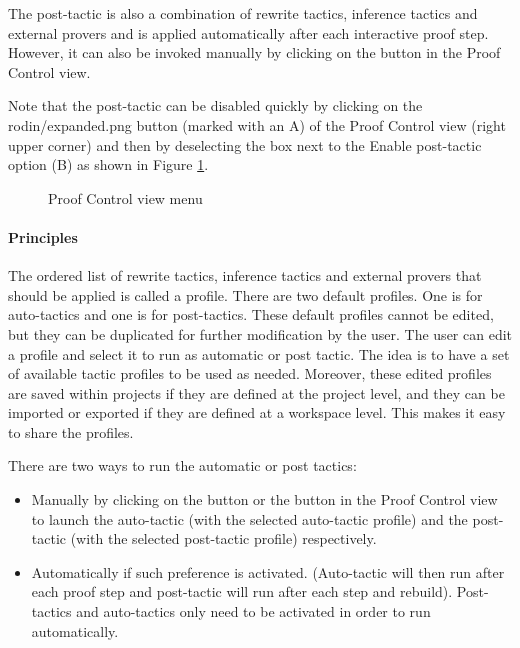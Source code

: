 The post-tactic is also a combination of rewrite tactics, inference tactics and external provers and is applied automatically after each interactive proof step. However, it can also be invoked manually by clicking on the  button in the \textsf{Proof Control} view.

Note that the post-tactic can be disabled quickly by clicking on the \textsf{rodin/expanded.png} button (marked with an A) of the \textsf{Proof Control} view (right upper corner) and then by deselecting the box next to the \textsf{Enable post-tactic} option (B) as shown in Figure \ref{fig_ref_01_proving_perspective12}. 

\begin{figure}[!ht]
\begin{center}
	\caption{Proof Control view menu}
	\label{fig_ref_01_proving_perspective12}
\end{center}
\end{figure}

\paragraph{Principles}

The ordered list of rewrite tactics, inference tactics and external provers that should be applied is called a profile. There are two default profiles. One is for auto-tactics and one is for post-tactics. These default profiles cannot be edited, but they can be duplicated for further modification by the user. The user can edit a profile and select it to run as automatic or post tactic. The idea is to have a set of available tactic profiles to be used as needed. Moreover, these edited profiles are saved within projects if they are defined at the project level, and they can be imported or exported if they are defined at a workspace level. This makes it easy to share the profiles. 

There are two ways to run the automatic or post tactics:

\begin{itemize}
	\item Manually by clicking on the  button or the  button in the \textsf{Proof Control view} to launch the auto-tactic (with the selected auto-tactic profile) and the post-tactic (with the selected post-tactic profile) respectively.
	\item Automatically if such preference is activated. (Auto-tactic will then run after each proof step and post-tactic will run after each step and rebuild). Post-tactics and auto-tactics only need to be activated in order to run automatically. 
\end{itemize}

